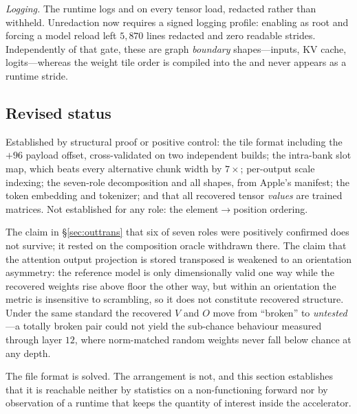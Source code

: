 \emph{Logging.} The runtime logs  and  on every tensor load, redacted rather
than withheld. Unredaction now requires a signed logging profile: enabling
 as root and forcing a model reload left $5{,}870$ lines redacted and zero
readable strides. Independently of that gate, these are graph \emph{boundary} shapes---inputs, KV
cache, logits---whereas the weight tile order is compiled into the  and never appears as a
runtime stride.

\subsection{Revised status}

\begin{observation}\label{obs:revised}
Established by structural proof or positive control: the tile format including the $+96$ payload
offset, cross-validated on two independent builds; the intra-bank slot map, which beats every
alternative chunk width by $7\times$; per-output scale indexing; the seven-role decomposition and all
shapes, from Apple's manifest; the token embedding and tokenizer; and that all recovered tensor
\emph{values} are trained matrices. Not established for any role: the element$\rightarrow$position
ordering.
\end{observation}

\noindent The claim in \S\ref{sec:outtrans} that six of seven roles were positively confirmed does not
survive; it rested on the composition oracle withdrawn there. The claim that the attention output
projection is stored transposed is weakened to an orientation asymmetry: the reference model is only
dimensionally valid one way while the recovered weights rise above floor the other way, but within an
orientation the metric is insensitive to scrambling, so it does not constitute recovered structure.
Under the same standard the recovered $V$ and $O$ move from ``broken'' to \emph{untested}---a totally
broken pair could not yield the sub-chance behaviour measured through layer $12$, where norm-matched
random weights never fall below chance at any depth.

The file format is solved. The arrangement is not, and this section establishes that it is reachable
neither by statistics on a non-functioning forward nor by observation of a runtime that keeps the
quantity of interest inside the accelerator.
